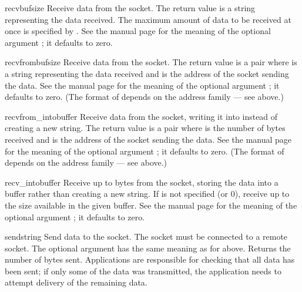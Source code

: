 \begin{methoddesc}[socket]{recv}{bufsize}
Receive data from the socket.  The return value is a string representing
the data received.  The maximum amount of data to be received
at once is specified by .  See the \UNIX{} manual page
 for the meaning of the optional argument
; it defaults to zero.
\end{methoddesc}

\begin{methoddesc}[socket]{recvfrom}{bufsize}
Receive data from the socket.  The return value is a pair
 where  is a string
representing the data received and  is the address of the
socket sending the data.  See the \UNIX{} manual page
 for the meaning of the optional argument
; it defaults to zero.
(The format of  depends on the address family --- see above.)
\end{methoddesc}

\begin{methoddesc}[socket]{recvfrom_into}{buffer}
Receive data from the socket, writing it into  instead of 
creating a new string.  The return value is a pair
 where  is the number
of bytes received and  is the address of the socket
sending the data.  See the \UNIX{} manual page
 for the meaning of the optional argument
; it defaults to zero.  (The format of 
depends on the address family --- see above.)
\end{methoddesc}

\begin{methoddesc}[socket]{recv_into}{buffer}
Receive up to  bytes from the socket,
storing the data into a buffer rather than creating a new string.    
If  is not specified (or 0), 
receive up to the size available in the given buffer.
See the \UNIX{} manual page  for the meaning of the
optional argument ; it defaults to zero.
\end{methoddesc}

\begin{methoddesc}[socket]{send}{string}
Send data to the socket.  The socket must be connected to a remote
socket.  The optional  argument has the same meaning as for
 above.  Returns the number of bytes sent.
Applications are responsible for checking that all data has been sent;
if only some of the data was transmitted, the application needs to
attempt delivery of the remaining data.
\end{methoddesc}

